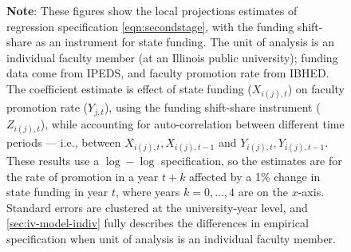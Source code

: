 \begin{figure}[H]
\begin{subfigure}[b]{0.495\textwidth}
        \label{fig:promoted-full-illinois-lp-rolling}
    \end{subfigure}
    \label{fig:promoted-illinois-lp-rolling}
    \justify
    \footnotesize
    \textbf{Note}:
    These figures show the local projections estimates of regression specification \eqref{eqn:secondstage}, with the funding shift-share as an instrument for state funding.
    The unit of analysis is an individual faculty member (at an Illinois public university); funding data come from IPEDS, and faculty promotion rate from IBHED.
    The coefficient estimate is effect of state funding ($X_{i(j),t}$) on faculty promotion rate ($Y_{j,t}$), using the funding shift-share instrument ($Z_{i(j),t}$), while accounting for auto-correlation between different time periods --- i.e., between $X_{i(j),t}, X_{i(j),t-1}$ and $Y_{i(j),t}, Y_{i(j),t-1}$.
    These results use a $\log-\log$ specification, so the estimates are for the rate of promotion in a year $t+k$ affected by a 1\% change in state funding in year $t$, where years $k = 0, \hdots, 4$ are on the $x$-axis. 
    Standard errors are clustered at the university-year level, and \autoref{sec:iv-model-indiv} fully describes the differences in empirical specification when unit of analysis is an individual faculty member.
\end{figure}

